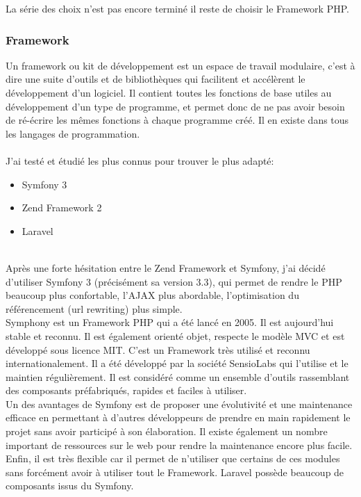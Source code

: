\documentclass[12pt]{article}
\begin{document}
 


La série des choix n'est pas encore terminé il reste de choisir le Framework PHP. 


\subsubsection{Framework }
Un framework ou kit de développement est un espace de travail modulaire, c'est à dire
une suite d'outils et de bibliothèques qui facilitent et accélèrent le développement d'un
logiciel. Il contient toutes les fonctions de base utiles au développement d'un type de
programme, et permet donc de ne pas avoir besoin de ré-écrire les mêmes fonctions à
chaque programme créé. Il en existe dans tous les langages de programmation.\\ \\
J'ai testé et étudié les plus connus pour trouver le plus adapté:
\begin{itemize}
\item Symfony 3
\item Zend Framework 2
\item Laravel
\end{itemize} \\

Après une forte hésitation  entre le Zend Framework et Symfony, j'ai décidé
d'utiliser Symfony 3 (précisément sa version 3.3), qui permet de  rendre le PHP beaucoup plus
confortable, l'AJAX plus abordable, l'optimisation du référencement (url rewriting) plus
simple.\\
Symphony est un Framework PHP qui a été lancé en 2005. Il est aujourd’hui stable et reconnu.
Il est également orienté objet, respecte le modèle MVC et est développé sous licence MIT.
C’est un Framework très utilisé et reconnu internationalement. Il a été développé par la société
SensioLabs qui l’utilise et le maintien régulièrement.
Il est considéré comme un ensemble d’outils rassemblant des composants préfabriqués,
rapides et faciles à utiliser.\\
Un des avantages de Symfony est de proposer une évolutivité et une maintenance efficace en
permettant à d’autres développeurs de prendre en main rapidement le projet sans avoir
participé à son élaboration. Il existe également un nombre important de ressources sur le web
pour rendre la maintenance encore plus facile. Enfin, il est très flexible car il permet de n’utiliser
que certains de ces modules sans forcément avoir à utiliser tout le Framework. Laravel
possède beaucoup de composants issus du Symfony.
\end{document}
